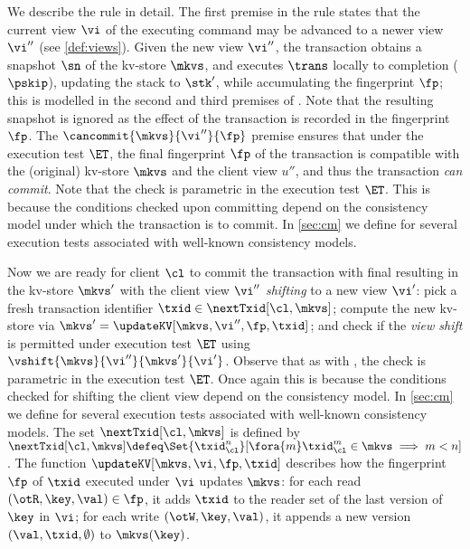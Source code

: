We describe the  rule in detail. 
The first premise in the rule
states that the current view $\vi$ of the executing command may be advanced to a newer  view $\vi''$ (see \cref{def:views}). 
Given the new view $\vi''$, the transaction obtains a snapshot $\sn$ of the kv-store $\mkvs$, 
and executes $\trans$ locally to completion ($\pskip$), updating the stack to $\stk'$, while accumulating the fingerprint $\fp$; 
this is modelled in the second and third premises of .
Note that the resulting snapshot is ignored 
as the effect of the transaction is recorded in the fingerprint $\fp$. 
%
The $\cancommit{\mkvs}{\vi''}{\fp}$ premise ensures that under the execution test $\ET$, 
the final fingerprint $\fp$ of the transaction is compatible with the (original) kv-store
$\mkvs$ and the client view $u''$, and thus the transaction \emph{can commit}. 
Note that the \cancommitname check is parametric in the execution test $\ET$.
This is because the conditions checked upon committing depend on the consistency model under which the transaction is to commit. 
In \cref{sec:cm} we define \cancommitname for several execution tests associated with well-known consistency models.


Now we are ready for client $\cl$ to commit the transaction with final resulting 
in the kv-store $\mkvs'$ with the client view $\vi''$ \emph{shifting} to a new view $\vi'$: 
pick a fresh transaction identifier $\txid \in \nextTxid[\cl,
  \mkvs]$;
compute the new kv-store via $\mkvs' = \updateKV[\mkvs, \vi'',
  \fp, \txid]$; 
and 
check if the \emph{view shift} is permitted under execution test $\ET$ using $\vshift{\mkvs}{\vi''}{\mkvs'}{\vi'}$. 
Observe that as with \cancommitname, the \vshiftname check is parametric in the execution test $\ET$. 
Once again this is because the conditions checked for shifting the client view depend on the consistency model. 
In \cref{sec:cm} we define \vshiftname for several execution tests associated with well-known consistency models.
The set $\nextTxid[\cl, \mkvs]$ is defined by
\(
\nextTxid[\cl, \mkvs] \defeq 
\Set{\txid_{\cl}^{n}}[%
\fora{m} \txid_{\cl}^{m} \in \mkvs \implies m < n ]
\).
The function $\updateKV[\mkvs, \vi, \fp, \txid]$
describes how the fingerprint $\fp$ of $\txid$ executed under $\vi$ updates $\mkvs$:
for each read $(\otR, \key, \val) \in \fp$, it adds $\txid$ 
to the reader set of the last version of $\key$ in $\vi$; 
for each write $(\otW, \key, \val)$, it appends a new version $(\val, \txid, \emptyset)$ 
to $\mkvs(\key)$. 



